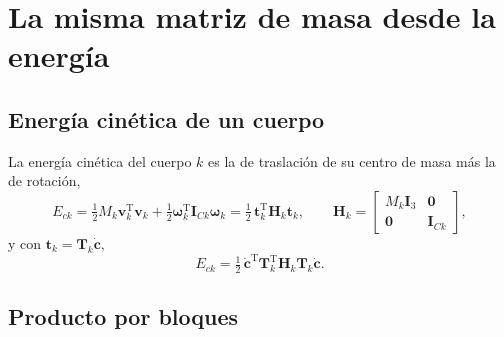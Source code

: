 \documentclass[11pt]{article}
\newcommand{\T}{^{\mathrm{T}}}
\newcommand{\wv}{\boldsymbol{\omega}}
\newcommand{\cd}{\dot{\mathbf{c}}}
\newcommand{\IC}[1]{\mathbf{I}_{C#1}}
\begin{document}
\section{La misma matriz de masa desde la energía}

\subsection{Energía cinética de un cuerpo}

La energía cinética del cuerpo $k$ es la de traslación de su centro de masa más la de rotación,
\begin{equation}
E_{ck}=\tfrac12M_k\mathbf{v}_k\T\mathbf{v}_k+\tfrac12\wv_k\T\IC{k}\wv_k
=\tfrac12\,\mathbf{t}_k\T\mathbf{H}_k\mathbf{t}_k ,
\qquad
\mathbf{H}_k=\begin{bmatrix}M_k\mathbf{I}_3 & \mathbf{0}\\ \mathbf{0} & \IC{k}\end{bmatrix},
\label{eq:Eck}
\end{equation}
y con $\mathbf{t}_k=\mathbf{T}_k\cd$,
\begin{equation}
E_{ck}=\tfrac12\,\cd\T\mathbf{T}_k\T\mathbf{H}_k\mathbf{T}_k\cd .
\label{eq:Eck2}
\end{equation}

\subsection{Producto por bloques}
\end{document}
